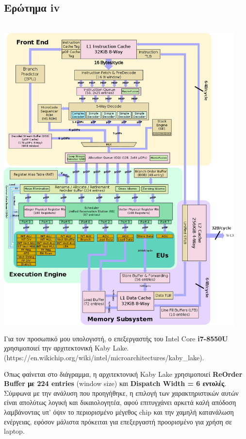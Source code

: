 \subsection{Ερώτημα iv}
   \begin{minipage}{\textwidth}
      \begin{center}
         \\
         \vspace{3mm}
         \includegraphics[width=0.94\textwidth]{./imgs/kaby.png}
      \end{center}
   \end{minipage}

   Για τον προσωπικό μου υπολογιστή, ο επεξεργαστής του Intel Core 
   \textbf{i7-8550U}
   χρησιμοποιεί την αρχιτεκτονική Kaby Lake.
   (https://en.wikichip.org/wiki/intel/microarchitectures/kaby\_lake).

   Όπως φαίνεται στο διάγραμμα, η αρχιτεκτονική Kaby Lake χρησιμοποιεί
   \textbf{ReOrder Buffer με 224 entries} (window size) και \textbf{Dispatch
   Width = 6 εντολές}. Σύμφωνα με την ανάλυση που προηγήθηκε, η επιλογή των
   χαρακτηριστικών αυτών είναι απολύτως λογική και δικαιολογητέα, αφού
   επιτυγχάνει αρκετά καλή απόδοση λαμβάνοντας υπ' όψιν το περιορισμένο μέγεθος
   chip και την χαμηλή κατανάλωση ενέργειας, εφόσον μάλιστα πρόκειται για
   επεξεργαστή προορισμένο για χρήση σε laptop. 
